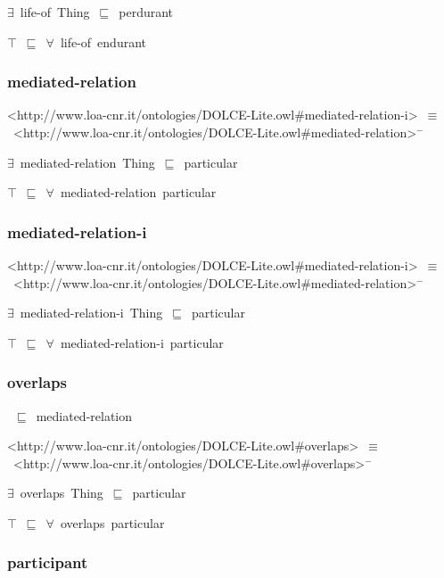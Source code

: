 \documentclass{article}
\begin{document}
\ensuremath{\exists}~life-of~Thing~\ensuremath{\sqsubseteq}~perdurant

\ensuremath{\top}~\ensuremath{\sqsubseteq}~\ensuremath{\forall}~life-of~endurant

\subsubsection*{mediated-relation}

<http://www.loa-cnr.it/ontologies/DOLCE-Lite.owl#mediated-relation-i>~\ensuremath{\equiv}~<http://www.loa-cnr.it/ontologies/DOLCE-Lite.owl#mediated-relation>\ensuremath{^-}

\ensuremath{\exists}~mediated-relation~Thing~\ensuremath{\sqsubseteq}~particular

\ensuremath{\top}~\ensuremath{\sqsubseteq}~\ensuremath{\forall}~mediated-relation~particular

\subsubsection*{mediated-relation-i}

<http://www.loa-cnr.it/ontologies/DOLCE-Lite.owl#mediated-relation-i>~\ensuremath{\equiv}~<http://www.loa-cnr.it/ontologies/DOLCE-Lite.owl#mediated-relation>\ensuremath{^-}

\ensuremath{\exists}~mediated-relation-i~Thing~\ensuremath{\sqsubseteq}~particular

\ensuremath{\top}~\ensuremath{\sqsubseteq}~\ensuremath{\forall}~mediated-relation-i~particular

\subsubsection*{overlaps}

~\ensuremath{\sqsubseteq}~mediated-relation

<http://www.loa-cnr.it/ontologies/DOLCE-Lite.owl#overlaps>~\ensuremath{\equiv}~<http://www.loa-cnr.it/ontologies/DOLCE-Lite.owl#overlaps>\ensuremath{^-}

\ensuremath{\exists}~overlaps~Thing~\ensuremath{\sqsubseteq}~particular

\ensuremath{\top}~\ensuremath{\sqsubseteq}~\ensuremath{\forall}~overlaps~particular

\subsubsection*{participant}
\end{document}
